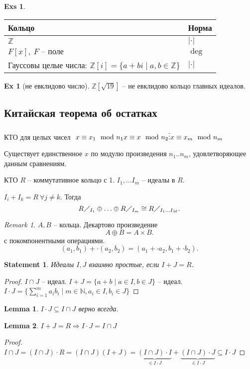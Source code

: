 \documentclass[11pt]{book}
\newcommand{\Z}{\mathbb{Z}}
\newcommand{\N}{\mathbb{N}}
\newcommand{\slim}{\sum\limits}
\theoremstyle{definition}
\theoremstyle{plain}
\theoremstyle{plain}
\newtheorem*{lm}{Lemma}
\newtheorem*{st}{Statement}
\theoremstyle{definition}
\newtheorem*{ex}{Ex}
\newtheorem*{exs}{Exs}
\theoremstyle{remark}
\newtheorem*{rem}{Remark}
\begin{document}
\begin{exs}
    \begin{tabular}[ht]{l|l}
	Кольцо & Норма\\
	\hline
	$ \Z$ &$ |\cdot|$\\
	$ F[x], ~ F \text{ -- поле}$ & $  \deg$\\
	Гауссовы целые числа: $ \Z[i] = \{a + bi \mid a, b \in\Z\}$ & $ |\cdot|$
    \end{tabular}
\end{exs}
\begin{ex}[не евклидово число]
    $ \Z [\sqrt{19}]$ -- не евклидово кольцо главных идеалов. 
\end{ex}
\subsection{Китайская теорема об остатках}
\begin{thm}{КТО для целых чисел} $ $
    $ x \equiv x_1 \mod n_1 \\
    x \equiv x \mod n_2 \\
    \vdots \\
    x  \equiv x_m \mod n_m$ 

    Существует единственное  $ x$ по модулю произведения $ n_1 .. n_m$, удовлетворяющее данным сравнениям.
\end{thm}
\begin{thm}{КТО}
    $ R$ -- коммутативное кольцо с 1.
    $ I_1, \ldots I_m$ -- идеалы в $ R$.

$ I_i + I_k = R ~ \forall  j \ne k$.
Тогда \[
    R\diagup _{I_1} \oplus \ldots  \oplus R\diagup _{I_m} \cong R \diagup _{I_1 \ldots I_M}
.\] 
\end{thm}
\begin{rem}
    $ A, B$ -- кольца. Декартово произведение \[
    A \oplus B = A \times  B
    .\] 
    с покомпонентными операциями.
    \[
	(a_1, b_1) + \cdot (a_2, b_2) = (a_1 + \cdot a_2, b_1 +\cdot b_2)
    .\] 
\end{rem}
\begin{st}
    Идеалы $ I, J$ взаимно простые, если $ I + J = R$.
\end{st}
\begin{proof}
    $ I \cap  J $ -- идеал.
    $ I + J = \{a + b \mid a \in I, b \in J\}$ -- идеал.
    $ I \cdot J = \{\slim _{i=1} ^{m} a_i b_i \mid m \in  \N, a_i \in I, b_i \in  J\}$
\end{proof}
\begin{lm}
   $I \cdot J \subseteq I \cap J$  верно всегда.
\end{lm}
\begin{lm}
    $ I + J = R \Longrightarrow I \cdot J = I \cap  J$
\end{lm}
\begin{proof}
    $ I \cap  J = (I \cap  J) \cdot R = (I \cap  J) (I + J) = \underbrace{(I \cap  J) \cdot I}_{ \in I \cdot J} + \underbrace{(I \cap J) \cdot J}_{ \in I \cdot J} \subseteq I \cdot J$
\end{proof}
\end{document}
